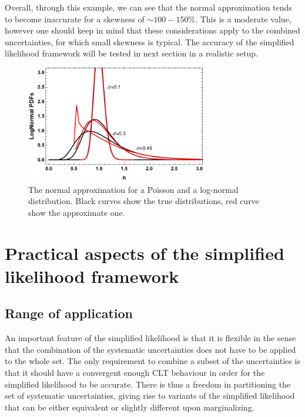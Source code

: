 \documentclass[11pt]{article}
\begin{document}
   Overall, through this example, we can see that the normal approximation tends to become inaccurate for a skewness of $\sim 100-150\%$. This is a moderate value, however one should keep in mind that these considerations apply to the combined uncertainties, for which small skewness is typical. The accuracy of the simplified likelihood framework will be tested in next section in a realistic setup.






\begin{figure}[t]
\begin{center}
\includegraphics[width=0.7\textwidth]{figures/PlotLogNormal.pdf}
\end{center}
\caption{\label{fig:approxs}
The normal approximation for a Poisson and a log-normal distribution. Black curves show the true distributions, red curve show the approximate one.
}
\end{figure}








\section{Practical aspects of the simplified likelihood framework}
\label{se:practice}

\subsection{Range of application}

An important feature of the simplified likelihood is that it is flexible in the sense that the combination of the systematic uncertainties does not have to be applied to the whole set.  The only requirement to combine a subset of the  uncertainties is that it should have a convergent enough  CLT behaviour in order  for the simplified likelihood to be accurate. There is thus a freedom in partitioning the set of systematic uncertainties, giving rise to variants of the simplified likelihood that can be either equivalent or slightly different upon  marginalizing.
\end{document}
